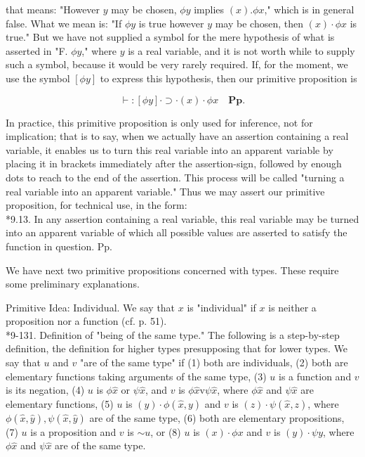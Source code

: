 \documentclass[10pt]{article}
\begin{document}
that means: "However $y$ may be chosen, $\phi y$ implies $(x) . \phi x$," which is in general false. What we mean is: "If $\phi y$ is true however $y$ may be chosen, then $(x) \cdot \phi x$ is true." But we have not supplied a symbol for the mere hypothesis of what is asserted in "F. $\phi y$," where $y$ is a real variable, and it is not worth while to supply such a symbol, because it would be very rarely required. If, for the moment, we use the symbol $[\phi y]$ to express this hypothesis, then our primitive proposition is

$$
\vdash:[\phi y] \cdot \supset \cdot(x) \cdot \phi x \quad \mathbf{P p} .
$$

In practice, this primitive proposition is only used for inference, not for implication; that is to say, when we actually have an assertion containing a real variable, it enables us to turn this real variable into an apparent variable by placing it in brackets immediately after the assertion-sign, followed by enough dots to reach to the end of the assertion. This process will be called "turning a real variable into an apparent variable." Thus we may assert our primitive proposition, for technical use, in the form:\\
*9.13. In any assertion containing a real variable, this real variable may be turned into an apparent variable of which all possible values are asserted to satisfy the function in question. Pp.

We have next two primitive propositions concerned with types. These require some preliminary explanations.

Primitive Idea: Individual. We say that $x$ is "individual" if $x$ is neither a proposition nor a function (cf. p. 51).\\
*9-131. Definition of "being of the same type." The following is a step-by-step definition, the definition for higher types presupposing that for lower types. We say that $u$ and $v$ "are of the same type" if (1) both are individuals, (2) both are elementary functions taking arguments of the same type, (3) $u$ is a function and $v$ is its negation, (4) $u$ is $\phi \hat{x}$ or $\psi \hat{x}$, and $v$ is $\phi \hat{x} \mathrm{v} \psi \hat{x}$, where $\phi \hat{x}$ and $\psi \hat{x}$ are elementary functions, (5) $u$ is $(y) \cdot \phi(\hat{x}, y)$ and $v$ is $(z) \cdot \psi(\hat{x}, z)$, where $\phi(\hat{x}, \hat{y}), \psi(\hat{x}, \hat{y})$ are of the same type, (6) both are elementary propositions, (7) $u$ is a proposition and $v$ is $\sim u$, or (8) $u$ is $(x) \cdot \phi x$ and $v$ is $(y) \cdot \psi y$, where $\phi \hat{x}$ and $\psi \hat{x}$ are of the same type.
\end{document}
